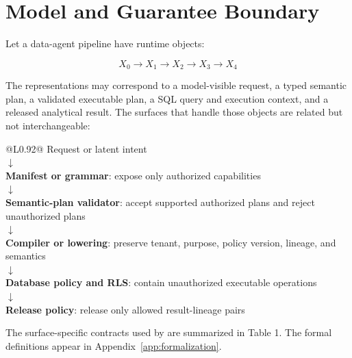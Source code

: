 \section{Model and Guarantee Boundary}

Let a data-agent pipeline have runtime objects:

\[
X_0 \to X_1 \to X_2 \to X_3 \to X_4
\]

The representations may correspond to a model-visible request, a typed semantic plan, a validated executable plan, a SQL query and execution context, and a released analytical result. The surfaces that handle those objects are related but not interchangeable:

\begin{center}
\vspace{-0.4em}
\footnotesize
\renewcommand{\arraystretch}{0.92}
\begin{tabular}{@{}L{0.92\columnwidth}@{}}
\toprule
Request or latent intent \\
$\downarrow$ \\
\textbf{Manifest or grammar}: expose only authorized capabilities \\
$\downarrow$ \\
\textbf{Semantic-plan validator}: accept supported authorized plans and reject unauthorized plans \\
$\downarrow$ \\
\textbf{Compiler or lowering}: preserve tenant, purpose, policy version, lineage, and semantics \\
$\downarrow$ \\
\textbf{Database policy and RLS}: contain unauthorized executable operations \\
$\downarrow$ \\
\textbf{Release policy}: release only allowed result-lineage pairs \\
\bottomrule
\end{tabular}
\vspace{-0.7em}
\end{center}

The surface-specific contracts used by \policystrata{} are summarized in Table 1. The formal definitions appear in Appendix~\ref{app:formalization}.

